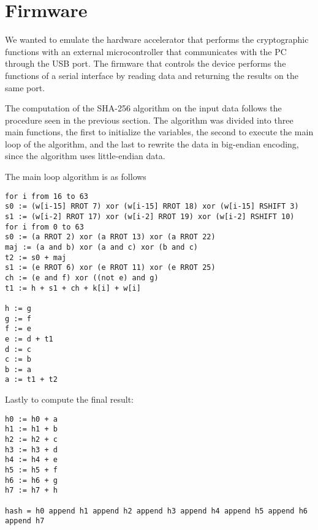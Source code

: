 \section{Firmware}
We wanted to emulate the hardware accelerator that performs the cryptographic functions with an external microcontroller that communicates with the PC through the USB port. The firmware that controls the device performs the functions of a serial interface by reading data and returning the results on the same port.

The computation of the SHA-256 algorithm on the input data follows the procedure seen in the previous section. The algorithm was divided into three main functions, the first to initialize the variables, the second to execute the main loop of the algorithm, and the last to rewrite the data in big-endian encoding, since the algorithm uses little-endian data.

The main loop algorithm is as follows
\begin{lstlisting}
for i from 16 to 63
s0 := (w[i-15] RROT 7) xor (w[i-15] RROT 18) xor (w[i-15] RSHIFT 3)
s1 := (w[i-2] RROT 17) xor (w[i-2] RROT 19) xor (w[i-2] RSHIFT 10)
for i from 0 to 63
s0 := (a RROT 2) xor (a RROT 13) xor (a RROT 22)
maj := (a and b) xor (a and c) xor (b and c)
t2 := s0 + maj
s1 := (e RROT 6) xor (e RROT 11) xor (e RROT 25)
ch := (e and f) xor ((not e) and g)
t1 := h + s1 + ch + k[i] + w[i]

h := g
g := f
f := e
e := d + t1
d := c
c := b
b := a
a := t1 + t2
\end{lstlisting}
Lastly to compute the final result:
\begin{lstlisting}
h0 := h0 + a
h1 := h1 + b
h2 := h2 + c
h3 := h3 + d
h4 := h4 + e
h5 := h5 + f
h6 := h6 + g
h7 := h7 + h

hash = h0 append h1 append h2 append h3 append h4 append h5 append h6 append h7

\end{lstlisting}
